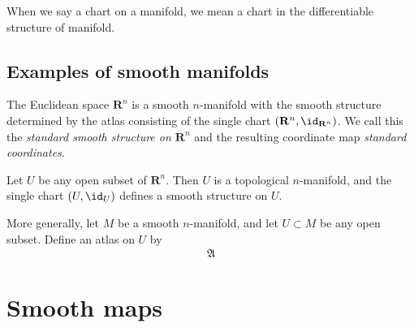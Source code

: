 \begin{notation}
    When we say a chart on a manifold, we mean a chart in the differentiable structure of manifold.
\end{notation}

\subsection{Examples of smooth manifolds}

\begin{example}
    The Euclidean space $\mathbf{R}^n$ is a smooth $n$-manifold with the smooth structure determined by the atlas consisting of the single chart $(\mathbf{R}^n, \id_{\mathbf{R}^n})$. We call this the \emph{standard smooth structure on $\mathbf{R}^n$} and the resulting coordinate map \emph{standard coordinates}.
\end{example}

\begin{comment}
\begin{example}[Finite-dimensional vector spaces]
    Let $V$ be a finite-dimensional vector space over $\mathbf{R}^n$. Any norm on $V$ determines a topology, which is independent of the choice of norm. With this topology, $V$ is a topological $n$-manifold, and has a natural smooth structure defined as follows. Every basis $(v_j)_{1 \leq j \leq n}$ for $V$ defines a basis isomorphism $v : \mathbf{R}^n \to V$ by
        \begin{align}
            v(x) := \sum_{j = 1}^{n}x_iv_i.
        \end{align}
    This map is a homeomorphism, so $(V, v^{-1})$ is a chart.
\end{example}
\end{comment}

\begin{example}
    Let $U$ be any open subset of $\mathbf{R}^n$. Then $U$ is a topological $n$-manifold, and the single chart $(U, \id_U)$ defines a smooth structure on $U$.

    More generally, let $M$ be a smooth $n$-manifold, and let $U \subset M$ be any open subset. Define an atlas on $U$ by
    \begin{align}
        \mathfrak{A}
    \end{align}
\end{example}

\section{Smooth maps}

